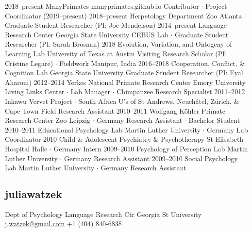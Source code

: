 \documentclass[]{friggeri-cv}
\begin{document}
\begin{entrylist}
  \entry
    {2018--present}
    {ManyPrimates}
    {manyprimates.github.io}
    {Contributor $\cdot$ Project Coordinator (2019--present)}
  \entry
    {2018--present}
    {Herpetology Department}
    {Zoo Atlanta}
    {Graduate Student Researcher (PI: Joe Mendelson)}
  \entry
    {2014--present}
    {Language Research Center}
    {Georgia State University}
    {CEBUS Lab $\cdot$ Graduate Student Researcher (PI: Sarah Brosnan)}
  \entry
    {2018}
    {Evolution, Variation, and Ontogeny of Learning Lab}
    {University of Texas at Austin}
    {Visiting Research Scholar (PI: Cristine Legare) $\cdot$ Fieldwork Manipur, India}
  \entry
    {2016--2018}
    {Cooperation, Conflict, \& Cognition Lab}
    {Georgia State University}
    {Graduate Student Researcher (PI: Eyal Aharoni)}
  \entry
    {2012--2014}
    {Yerkes National Primate Research Center}
    {Emory University}
    {Living Links Center $\cdot$ Lab Manager $\cdot$ Chimpanzee Research Specialist}
  \entry
    {2011--2012}
    {Inkawu Vervet Project $\cdot$ South Africa}
    {U's of St Andrews, Neuch\^{a}tel, Z\"urich, \& Cape Town}
    {Field Research Assistant}
  \entry
    {2010--2011}
    {Wolfgang K\"{o}hler Primate Research Center}
    {Zoo Leipzig $\cdot$ Germany}
    {Research Assistant $\cdot$ Bachelor Student}
  \entry
    {2010--2011}
    {Educational Psychology Lab}
    {Martin Luther University $\cdot$ Germany}
    {Lab Coordinator}
  \entry
    {2010}
    {Child \& Adolescent Psychiatry \& Psychotherapy}
    {St Elisabeth Hospital Halle $\cdot$ Germany}
    {Intern}
  \entry
    {2009--2010}
    {Psychology of Perception Lab}
    {Martin Luther University $\cdot$ Germany}
    {Research Assistant}
  \entry
    {2009--2010}
    {Social Psychology Lab}
    {Martin Luther University $\cdot$ Germany}
    {Research Assistant}
\end{entrylist}



\newpage

\begin{aside}
  \section{{\normalfont julia}watzek}
    Dept of Psychology
    Language Research Ctr
    Georgia St University
    ~
    \href{mailto:j.watzek@gmail.com}{j.watzek@gmail.com}
    +1 (404) 840-6838
\end{aside}
\end{document}
